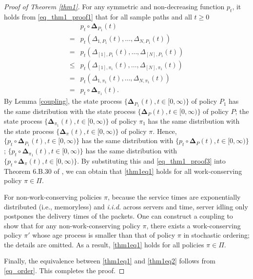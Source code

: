 \begin{proof}[Proof of Theorem \ref{thm1}]
For any symmetric and non-decreasing   function $p_t$, it holds from \eqref{eq_thm1_proof1} that for all sample paths and all $t\geq 0$
\begin{align}\label{eq_thm1_proof3}
&p_t\circ \bm \Delta_{P_1}(t) \nonumber\\
=& p_t(\Delta_{1,P_1} (t), \ldots, \Delta_{N,P_1} (t))\nonumber\\
=& p_t (\Delta_{[1],P_1} (t), \ldots, \Delta_{[N],P_1} (t))\nonumber\\
\leq & p_t (\Delta_{[1],\pi_1} (t), \ldots, \Delta_{[N],\pi_1} (t))\nonumber\\
=& p_t (\Delta_{1,\pi_1} (t), \ldots, \Delta_{N,\pi_1} (t))\nonumber\\
=& p_t\circ \bm \Delta_{\pi_1}(t).
\end{align}
By Lemma \ref{coupling}, the state process $\{\bm\Delta_{P_1}(t),t\in [0,\infty)\}$ of policy $P_1$ has the same distribution with the state process $\{\bm\Delta_{P}(t),t\in [0,\infty)\}$ of policy $P$;
the state process $\{\bm\Delta_{\pi_1}(t),t\in [0,\infty)\}$ of policy $\pi_1$ has the same distribution with the state process $\{\bm\Delta_{\pi}(t),t\in [0,\infty)\}$  of policy $\pi$. Hence, $\{p_t\circ\bm\Delta_{P_1}(t),t\in [0,\infty)\}$ has the same distribution with $\{p_t\circ\bm\Delta_{P}(t),t\in [0,\infty)\}$; $\{p_t\circ\bm\Delta_{\pi_1}(t),t\in [0,\infty)\}$ has the same distribution with $\{p_t\circ\bm\Delta_{\pi}(t),t\in [0,\infty)\}$. By substituting this and \eqref{eq_thm1_proof3} into Theorem 6.B.30 of \cite{StochasticOrderBook}, we can obtain that \eqref{thm1eq1} holds for all work-conserving policy $\pi\in\Pi$. 

For non-work-conserving policies $\pi$, because the service times are exponentially distributed (i.e., memoryless) and \emph{i.i.d.} across servers and time, server idling only postpones the delivery times of the packets. One can construct a coupling to show that for any non-work-conserving policy $\pi$, there exists a work-conserving policy $\pi'$ whose age process is smaller than that of policy $\pi$ in stochastic ordering; the details are omitted. 
As a result, \eqref{thm1eq1} holds for all policies $\pi\in\Pi$. 


Finally, the equivalence between \eqref{thm1eq1} and \eqref{thm1eq2} follows from \eqref{eq_order}. This completes the proof.
\end{proof}

